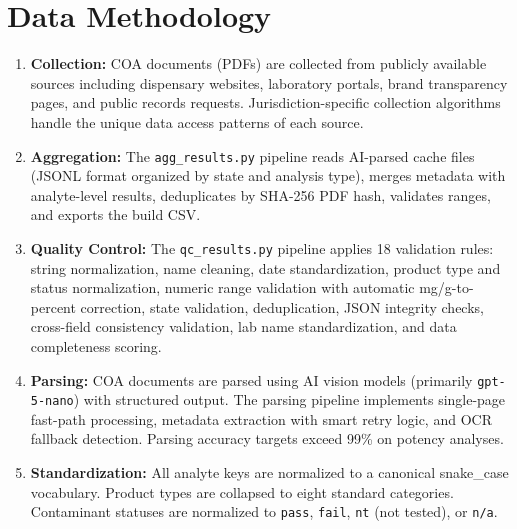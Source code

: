 \documentclass[11pt,letterpaper]{article}
\begin{document}
\section{Data Methodology}

\begin{enumerate}[leftmargin=1.5em, itemsep=0.4em]

\item \textbf{Collection:} COA documents (PDFs) are collected from
publicly available sources including dispensary websites, laboratory
portals, brand transparency pages, and public records requests.
Jurisdiction-specific collection algorithms handle the unique data
access patterns of each source.

\item \textbf{Aggregation:} The \texttt{agg\_results.py} pipeline
reads AI-parsed cache files (JSONL format organized by state and
analysis type), merges metadata with analyte-level results, deduplicates
by SHA-256 PDF hash, validates ranges, and exports the build CSV.

\item \textbf{Quality Control:} The \texttt{qc\_results.py} pipeline
applies 18 validation rules: string normalization, name cleaning,
date standardization, product type and status normalization, numeric
range validation with automatic mg/g-to-percent correction, state
validation, deduplication, JSON integrity checks, cross-field
consistency validation, lab name standardization, and data
completeness scoring.

\item \textbf{Parsing:} COA documents are parsed using AI vision
models (primarily \texttt{gpt-5-nano}) with structured output.
The parsing pipeline implements single-page fast-path processing,
metadata extraction with smart retry logic, and OCR fallback detection.
Parsing accuracy targets exceed 99\% on potency analyses.

\item \textbf{Standardization:} All analyte keys are normalized to
a canonical snake\_case vocabulary. Product types are collapsed to
eight standard categories. Contaminant statuses are normalized to
\texttt{pass}, \texttt{fail}, \texttt{nt} (not tested), or
\texttt{n/a}.

\end{enumerate}
\end{document}
